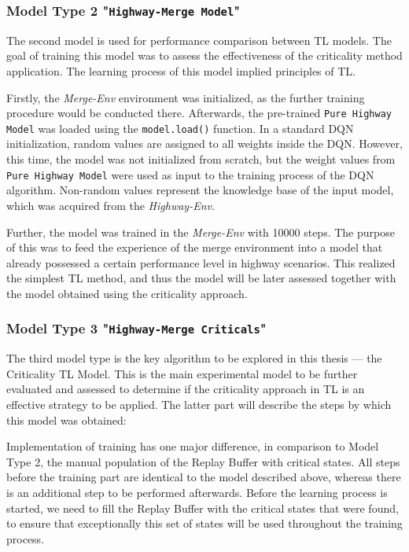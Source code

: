 \subsubsection{Model Type 2 "\texttt{Highway-Merge Model}"}

The second model is used for performance comparison between TL models. The goal of training this model was to assess the effectiveness of the criticality method application. The learning process of this model implied principles of TL.

Firstly, the \emph{Merge-Env} environment was initialized, as the further training procedure would be conducted there. Afterwards, the pre-trained \texttt{Pure Highway Model} was loaded using the \texttt{model.load()} function. In a standard DQN initialization, random values are assigned to all weights inside the DQN. However, this time, the model was not initialized from scratch, but the weight values from \texttt{Pure Highway Model} were used as input to the training process of the DQN algorithm. Non-random values represent the knowledge base of the input model, which was acquired from the \emph{Highway-Env}.

Further, the model was trained in the \emph{Merge-Env} with 10000 steps. The purpose of this was to feed the experience of the merge environment into a model that already possessed a certain performance level in highway scenarios. This realized the simplest TL method, and thus the model will be later assessed together with the model obtained using the criticality approach.

\subsubsection{Model Type 3 "\texttt{Highway-Merge Criticals}"}

The third model type is the key algorithm to be explored in this thesis — the Criticality TL Model. This is the main experimental model to be further evaluated and assessed to determine if the criticality approach in TL is an effective strategy to be applied. The latter part will describe the steps by which this model was obtained:

Implementation of training has one major difference, in comparison to Model Type 2, the manual population of the Replay Buffer with critical states. All steps before the training part are identical to the model described above, whereas there is an additional step to be performed afterwards. Before the learning process is started, we need to fill the Replay Buffer with the critical states that were found, to ensure that exceptionally this set of states will be used throughout the training process. 

